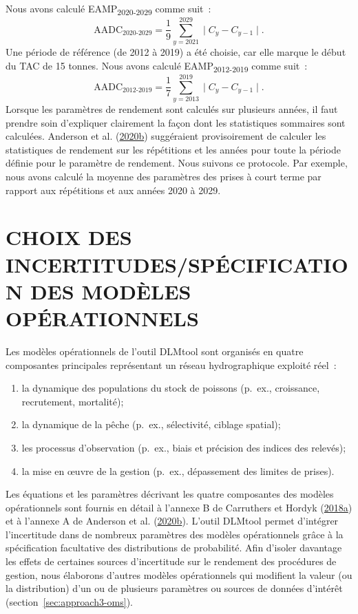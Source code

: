 \documentclass[french,11pt]{book}
\begin{document}
Nous avons calculé EAMP\textsubscript{2020-2029} comme suit~:
\begin{equation}
\textrm{AADC}_\textrm{2020-2029} = \dfrac{1}{9}\sum_{y=2021}^{2029} \mid C_y - C_{y-1} \mid.
\end{equation}
Une période de référence (de 2012 à 2019) a été choisie, car elle marque le début du TAC de 15 tonnes. Nous avons calculé EAMP\textsubscript{2012-2019} comme suit~:
\begin{equation}
\textrm{AADC}_\textrm{2012-2019} = \dfrac{1}{7}\sum_{y=2013}^{2019} \mid C_y - C_{y-1} \mid.
\end{equation}
Lorsque les paramètres de rendement sont calculés sur plusieurs années, il faut prendre soin d'expliquer clairement la façon dont les statistiques sommaires sont calculées. Anderson et al. (\protect\hyperlink{ref-anderson2020gfmp}{2020b}) suggéraient provisoirement de calculer les statistiques de rendement sur les répétitions et les années pour toute la période définie pour le paramètre de rendement. Nous suivons ce protocole. Par exemple, nous avons calculé la moyenne des paramètres des prises à court terme par rapport aux répétitions et aux années 2020 à 2029.

\hypertarget{sec:om}{%
\section{CHOIX DES INCERTITUDES/SPÉCIFICATION DES MODÈLES OPÉRATIONNELS}\label{sec:om}}

Les modèles opérationnels de l'outil DLMtool sont organisés en quatre composantes principales représentant un réseau hydrographique exploité réel~:
\begin{enumerate}
\def\labelenumi{\arabic{enumi}.}

\item
  la dynamique des populations du stock de poissons (p.~ex., croissance, recrutement, mortalité);
\item
  la dynamique de la pêche (p.~ex., sélectivité, ciblage spatial);
\item
  les processus d'observation (p.~ex., biais et précision des indices des relevés);
\item
  la mise en œuvre de la gestion (p.~ex., dépassement des limites de prises).
\end{enumerate}
Les équations et les paramètres décrivant les quatre composantes des modèles opérationnels sont fournis en détail à l'annexe B de Carruthers et Hordyk (\protect\hyperlink{ref-carruthers2018}{2018a}) et à l'annexe A de Anderson et al. (\protect\hyperlink{ref-anderson2020gfmp}{2020b}). L'outil DLMtool permet d'intégrer l'incertitude dans de nombreux paramètres des modèles opérationnels grâce à la spécification facultative des distributions de probabilité. Afin d'isoler davantage les effets de certaines sources d'incertitude sur le rendement des procédures de gestion, nous élaborons d'autres modèles opérationnels qui modifient la valeur (ou la distribution) d'un ou de plusieurs paramètres ou sources de données d'intérêt (section~\ref{sec:approach3-oms}).
\end{document}
